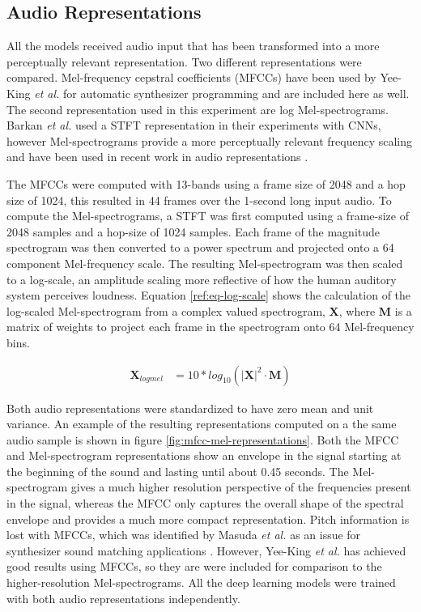 \subsection{Audio Representations}
All the models received audio input that has been transformed into a more perceptually relevant representation. Two different representations were compared. Mel-frequency cepstral coefficients (MFCCs) have been used by Yee-King \textit{et al.} \cite{yee2011automatic, yee2018automatic} for automatic synthesizer programming and are included here as well. The second representation used in this experiment are log Mel-spectrograms. Barkan \textit{et al.} \cite{barkan2019inversynth} used a STFT representation in their experiments with CNNs, however Mel-spectrograms provide a more perceptually relevant frequency scaling and have been used in recent work in audio representations \cite{cramer:learnmore:icassp:19, hershey2017cnn}. 

The MFCCs were computed with 13-bands using a frame size of 2048 and a hop size of 1024, this resulted in 44 frames over the 1-second long input audio. To compute the Mel-spectrograms, a STFT was first computed using a frame-size of 2048 samples and a hop-size of 1024 samples. Each frame of the magnitude spectrogram was then converted to a power spectrum and projected onto a 64 component Mel-frequency scale. The resulting Mel-spectrogram was then scaled to a log-scale, an amplitude scaling more reflective of how the human auditory system perceives loudness. Equation \ref{ref:eq-log-scale} shows the calculation of the log-scaled Mel-spectrogram from a complex valued spectrogram, $\textbf{X}$, where $\textbf{M}$ is a matrix of weights to project each frame in the spectrogram onto 64 Mel-frequency bins.

\begin{align}\label{ref:eq-log-scale}
    \textbf{X}_{logmel} &= 10*log_{10}(|\textbf{X}|^2 \cdot \textbf{M})
\end{align}

Both audio representations were standardized to have zero mean and unit variance. An example of the resulting representations computed on a the same audio sample is shown in figure \ref{fig:mfcc-mel-representations}. Both the MFCC and Mel-spectrogram representations show an envelope in the signal starting at the beginning of the sound and lasting until about 0.45 seconds. The Mel-spectrogram gives a much higher resolution perspective of the frequencies present in the signal, whereas the MFCC only captures the overall shape of the spectral envelope and provides a much more compact representation. Pitch information is lost with MFCCs, which was identified by Masuda \textit{et al.} as an issue for synthesizer sound matching applications \cite{masudo2021quality}. However, Yee-King \textit{et al.} has achieved good results using MFCCs, so they are were included for comparison to the higher-resolution Mel-spectrograms. All the deep learning models were trained with both audio representations independently.

